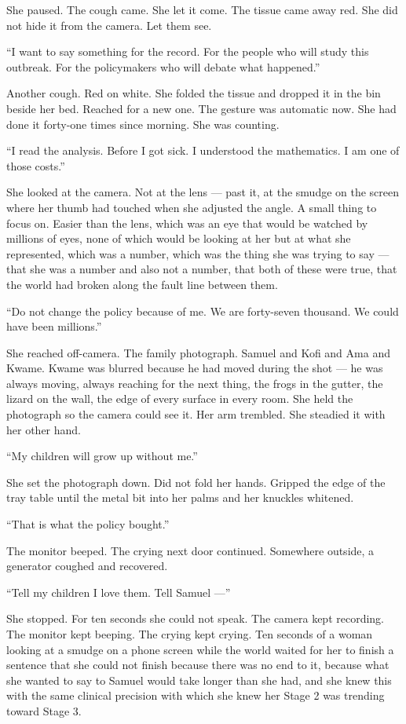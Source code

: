 \documentclass[11pt]{article}
\begin{document}
She paused. The cough came. She let it come. The tissue came away red. She did not hide it from the camera. Let them see.

``I want to say something for the record. For the people who will study this outbreak. For the policymakers who will debate what happened.''

Another cough. Red on white. She folded the tissue and dropped it in the bin beside her bed. Reached for a new one. The gesture was automatic now. She had done it forty-one times since morning. She was counting.

``I read the analysis. Before I got sick. I understood the mathematics. I am one of those costs.''

She looked at the camera. Not at the lens --- past it, at the smudge on the screen where her thumb had touched when she adjusted the angle. A small thing to focus on. Easier than the lens, which was an eye that would be watched by millions of eyes, none of which would be looking at her but at what she represented, which was a number, which was the thing she was trying to say --- that she was a number and also not a number, that both of these were true, that the world had broken along the fault line between them.

``Do not change the policy because of me. We are forty-seven thousand. We could have been millions.''

She reached off-camera. The family photograph. Samuel and Kofi and Ama and Kwame. Kwame was blurred because he had moved during the shot --- he was always moving, always reaching for the next thing, the frogs in the gutter, the lizard on the wall, the edge of every surface in every room. She held the photograph so the camera could see it. Her arm trembled. She steadied it with her other hand.

``My children will grow up without me.''

She set the photograph down. Did not fold her hands. Gripped the edge of the tray table until the metal bit into her palms and her knuckles whitened.

``That is what the policy bought.''

The monitor beeped. The crying next door continued. Somewhere outside, a generator coughed and recovered.

``Tell my children I love them. Tell Samuel ---''

She stopped. For ten seconds she could not speak. The camera kept recording. The monitor kept beeping. The crying kept crying. Ten seconds of a woman looking at a smudge on a phone screen while the world waited for her to finish a sentence that she could not finish because there was no end to it, because what she wanted to say to Samuel would take longer than she had, and she knew this with the same clinical precision with which she knew her Stage 2 was trending toward Stage 3.
\end{document}
